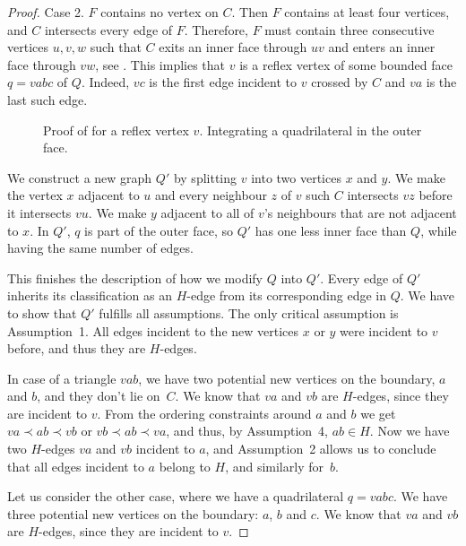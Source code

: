 \begin{proof}
   
Case 2. $F$ contains no vertex on $C$.
Then $F$ contains at least four vertices, and $C$ intersects
   every edge of $F$.  Therefore,  
   $F$
    must contain three consecutive vertices
   $u,v,w$ such that $C$ exits an inner face through $uv$ and enters
   an inner face through $vw$, see .
  This implies that $v$ is a reflex vertex
   of some bounded face $q=vabc$ of $Q$.  Indeed, $vc$ is the first edge
   incident to $v$ crossed by $C$ and $va$ is the last such edge.

  \begin{figure}
     \caption{Proof of  for a reflex
       vertex $v$. Integrating a quadrilateral in the outer face.}
  \end{figure}
   

   We construct a new graph $Q'$ by splitting $v$ into two vertices $x$
   and $y$.  We make the vertex $x$ adjacent to $u$ and every neighbour
   $z$ of $v$ such $C$ intersects $vz$ before it intersects $vu$.  We make
   $y$ adjacent to all of $v$'s neighbours that are not adjacent to $x$.
   In $Q'$, $q$ is part of the outer face, so $Q'$ has one less inner
   face than $Q$, while having the same number of edges.

   This finishes the description of how we modify $Q$ into $Q'$.
Every edge of $Q'$ inherits its classification as an $H$-edge from
its corresponding edge in $Q$.
   We have
to
show that $Q'$ fulfills all assumptions.
The only critical assumption is Assumption~1.
All edges incident to the new vertices $x$ or $y$ were incident to $v$
before, and thus they are $H$-edges.

In case of a triangle $vab$, we have two potential new vertices on the
boundary, $a$ and $b$, and they don't lie on~$C$. We know that $va$
and $vb$ are $H$-edges, since they are incident to $v$.
From the ordering constraints around $a$ and $b$ we get
$va\prec ab\prec vb$
or
$vb\prec ab\prec va$, and thus, by Assumption~4, $ab\in H$.
Now we have two $H$-edges $va$ and $vb$ incident to $a$,
and Assumption~2 allows us to conclude that all edges incident
to $a$ belong to $H$, and similarly for~$b$.
   
Let us consider the other case, where we have a quadrilateral 
$q=vabc$.
We have three potential new vertices on the
boundary: $a$, $b$ and $c$. We know that $va$
and $vb$ are $H$-edges, since they are incident to $v$.


\end{proof}
